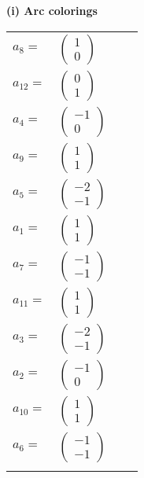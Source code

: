 \documentclass[1p]{elsarticle_modified}
\theoremstyle{definition}
\begin{document}
\flushleft \textbf{(i) Arc colorings}\\
\begin{tabular}{m{7pt} m{180pt} m{7pt} m{180pt} }
\flushright $a_{8}=$&$\begin{pmatrix}1\\0\end{pmatrix}$ \\
\flushright $a_{12}=$&$\begin{pmatrix}0\\1\end{pmatrix}$ \\
\flushright $a_{4}=$&$\begin{pmatrix}-1\\0\end{pmatrix}$ \\
\flushright $a_{9}=$&$\begin{pmatrix}1\\1\end{pmatrix}$ \\
\flushright $a_{5}=$&$\begin{pmatrix}-2\\-1\end{pmatrix}$ \\
\flushright $a_{1}=$&$\begin{pmatrix}1\\1\end{pmatrix}$ \\
\flushright $a_{7}=$&$\begin{pmatrix}-1\\-1\end{pmatrix}$ \\
\flushright $a_{11}=$&$\begin{pmatrix}1\\1\end{pmatrix}$ \\
\flushright $a_{3}=$&$\begin{pmatrix}-2\\-1\end{pmatrix}$ \\
\flushright $a_{2}=$&$\begin{pmatrix}-1\\0\end{pmatrix}$ \\
\flushright $a_{10}=$&$\begin{pmatrix}1\\1\end{pmatrix}$ \\
\flushright $a_{6}=$&$\begin{pmatrix}-1\\-1\end{pmatrix}$\\&\end{tabular}
\end{document}
